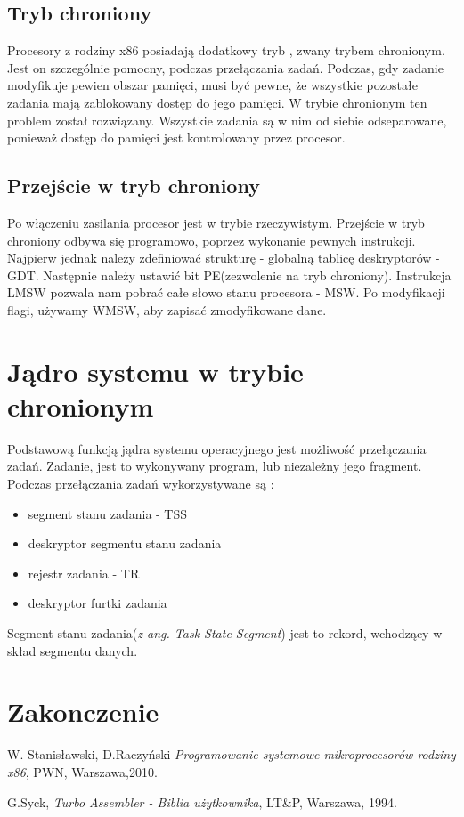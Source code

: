\documentclass[a4paper,12pt]{article}
\begin{document}
	
	
	\subsection{Tryb chroniony}
	Procesory z rodziny x86  posiadają dodatkowy tryb , zwany trybem chronionym. Jest on szczególnie pomocny, podczas przełączania zadań. Podczas, gdy zadanie modyfikuje pewien obszar pamięci, musi być pewne, że wszystkie pozostałe zadania mają zablokowany dostęp do jego pamięci. W trybie chronionym ten problem został rozwiązany. Wszystkie zadania są w nim od siebie odseparowane, ponieważ dostęp do pamięci jest kontrolowany przez procesor. 

	\subsection{Przejście w tryb chroniony}
	Po włączeniu zasilania procesor jest w trybie rzeczywistym. Przejście w tryb chroniony odbywa się programowo, poprzez wykonanie pewnych instrukcji. Najpierw jednak należy zdefiniować strukturę - globalną tablicę deskryptorów - GDT.  Następnie należy ustawić bit PE(zezwolenie na tryb chroniony). Instrukcja LMSW pozwala nam pobrać całe słowo stanu procesora -  MSW. Po modyfikacji flagi, używamy WMSW, aby zapisać zmodyfikowane dane.
	
	\section{Jądro systemu w trybie chronionym}
	
	Podstawową funkcją jądra systemu operacyjnego jest możliwość przełączania zadań. Zadanie, jest to wykonywany program, lub niezależny jego fragment. Podczas przełączania zadań wykorzystywane są :
	\begin{itemize}
	\item{segment stanu zadania - TSS}
	\item{deskryptor segmentu stanu zadania}
	\item{rejestr zadania - TR}
	\item{deskryptor furtki zadania}
	\end{itemize}
Segment stanu zadania(\textit{z ang. Task State Segment}) jest to rekord, wchodzący w skład segmentu danych. 
	\section{Zakonczenie}

	

\begin{thebibliography}{999}
 W. Stanisławski, D.Raczyński 
{\em Programowanie systemowe mikroprocesorów rodziny x86},
PWN, Warszawa,2010.

 G.Syck,
{\em Turbo Assembler - Biblia użytkownika}, 
LT\&P, Warszawa, 1994.



\end{thebibliography}	
\end{document}
